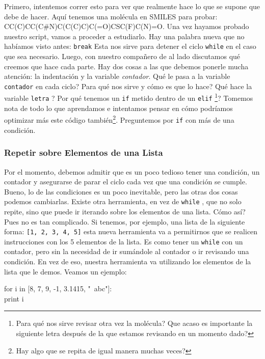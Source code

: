 \documentclass[10pt,letterpaper]{article}
\newcommand{\inlinecode}[1]{
\colorbox{light-gray}{\texttt{#1}}
}
\newenvironment{Code}
{
\begin{lrbox}{\selvestebox}%
\begin{minipage}{\dimexpr\columnwidth-2\fboxsep\relax}
\fontfamily{\ttdefault}\selectfont
}
{\end{minipage}\end{lrbox}%
\begin{center}
\colorbox{light-gray}{\usebox{\selvestebox}}
\end{center}
}
\begin{document}
Primero, intentemos correr esto para ver que realmente hace lo que se supone que debe de hacer. Aqu\'i tenemos una mol\'ecula en SMILES para probar: CC(C)CC(C\#N)C(C(C)C)C(=O)CSC(F)C(N)=O. Una vez hayamos probado nuestro script, vamos a proceder a estudiarlo. Hay una palabra nueva que no hab\'iamos visto antes: \inlinecode{break} Esta nos sirve para detener el ciclo \inlinecode{while} en el caso que sea necesario. Luego, con nuestro compa\~nero de al lado discutamos qu\'e creemos que hace cada parte. Hay dos cosas a las que debemos ponerle mucha atenci\'on: la indentaci\'on y la variable \emph{contador}. Qu\'e le pasa a la variable \inlinecode{contador} en cada ciclo? Para qu\'e nos sirve y c\'omo es que lo hace? Qu\'e hace la variable \inlinecode{letra}? Por qu\'e tenemos un \inlinecode{if} metido dentro de un \inlinecode{elif}\footnote{Para qu\'e nos sirve revisar otra vez la mol\'ecula? Que acaso es importante la siguiente letra despu\'es de la que estamos revisando en un momento dado?}? Tomemos nota de todo lo que aprendamos e intentamos pensar en c\'omo podr\'iamos optimizar m\'as este c\'odigo tambi\'en\footnote{Hay algo que se repita de igual manera muchas veces?}. Preguntemos por \inlinecode{if} con m\'as de una condici\'on.

\subsubsection{Repetir sobre Elementos de una Lista}
Por el momento, debemos admitir que es un poco tedioso tener una condici\'on, un contador y asegurarse de parar el ciclo cada vez que una condici\'on se cumple. Bueno, lo de las condiciones es un poco inevitable, pero las otras dos cosas podemos cambiarlas. Existe otra herramienta, en vez de \inlinecode{while}, que no solo repite, sino que puede ir iterando sobre los elementos de una lista. C\'omo as\'i? Pues no es tan complicado. Si tenemos, por ejemplo, una lista de la siguiente forma: \inlinecode{[1, 2, 3, 4, 5]} esta nueva herramienta va a permitirnos que se realicen instrucciones con los 5 elementos de la lista. Es como tener un \inlinecode{while} con un contador, pero sin la necesidad de ir sum\'andole al contador o ir revisando una condici\'on. En vez de eso, nuestra herramienta va utilizando los elementos de la lista que le demos. Veamos un ejemplo:

\begin{Code}
for i in [8, 7, 9, -1, 3.1415, "\ \hspace*{-2mm}abc"]:\\
\hspace*{5mm}print i
\end{Code}
\end{document}
